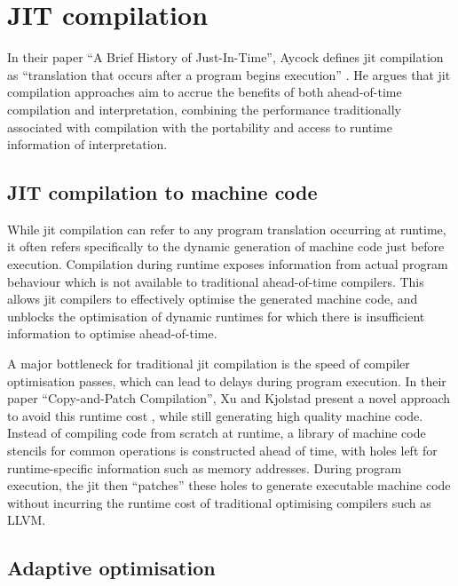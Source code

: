 \section{JIT compilation}
\label{sec:jit-compilation}

In their paper ``A Brief History of Just-In-Time'', Aycock defines \acf{jit} compilation as ``translation that occurs after a program begins execution'' \cite{aycockBriefHistoryJustintime2003}.
He argues that \ac{jit} compilation approaches aim to accrue the benefits of both ahead-of-time compilation and interpretation, combining the performance traditionally associated with compilation with the portability and access to runtime information of interpretation.

\subsection{JIT compilation to machine code}
\label{ssec:jit-compilation-machine-code}

While \acf{jit} compilation can refer to any program translation occurring at runtime, it often refers specifically to the dynamic generation of machine code just before execution.
Compilation during runtime exposes information from actual program behaviour which is not available to traditional ahead-of-time compilers.
This allows \ac{jit} compilers to effectively optimise the generated machine code, and unblocks the optimisation of dynamic runtimes for which there is insufficient information to optimise ahead-of-time.

A major bottleneck for traditional \ac{jit} compilation is the speed of compiler optimisation passes, which can lead to delays during program execution.
In their paper ``Copy-and-Patch Compilation'', Xu and Kjolstad present a novel approach to avoid this runtime cost \cite{xuCopyandpatchCompilationFast2021a}, while still generating high quality machine code.
Instead of compiling code from scratch at runtime, a library of machine code stencils for common operations is constructed ahead of time, with holes left for runtime-specific information such as memory addresses. During program execution, the \ac{jit} then ``patches'' these holes to generate executable machine code without incurring the runtime cost of traditional optimising compilers such as LLVM.


\subsection{Adaptive optimisation}
\label{ssec:adaptive-optimisation}

